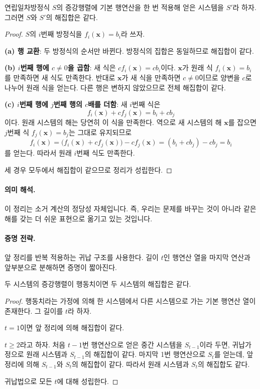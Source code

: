 \begin{theorem}
연립일차방정식 $S$의 증강행렬에 기본 행연산을 한 번 적용해 얻은 시스템을 $S'$라 하자. 그러면 $S$와 $S'$의 해집합은 같다.
\end{theorem}

\begin{proof}
$S$의 $i$번째 방정식을 $f_i(\mathbf{x})=b_i$라 쓰자.

\textbf{(a) 행 교환}:
두 방정식의 순서만 바뀐다. 방정식의 집합은 동일하므로 해집합이 같다.

\textbf{(b) $i$번째 행에 $c\neq 0$을 곱함}:
새 식은 $c f_i(\mathbf{x})=c b_i$이다.  
$\mathbf{x}$가 원래 식 $f_i(\mathbf{x})=b_i$를 만족하면 새 식도 만족한다.  
반대로 $\mathbf{x}$가 새 식을 만족하면 $c\neq 0$이므로 양변을 $c$로 나누어 원래 식을 얻는다. 다른 행은 변하지 않았으므로 전체 해집합이 같다.

\textbf{(c) $i$번째 행에 $j$번째 행의 $c$배를 더함}:
새 $i$번째 식은
\[
f_i(\mathbf{x})+c f_j(\mathbf{x})=b_i+c b_j
\]
이다. 원래 시스템의 해는 당연히 이 식을 만족한다.  
역으로 새 시스템의 해 $\mathbf{x}$를 잡으면 $j$번째 식 $f_j(\mathbf{x})=b_j$는 그대로 유지되므로
\[
f_i(\mathbf{x})=\bigl(f_i(\mathbf{x})+c f_j(\mathbf{x})\bigr)-c f_j(\mathbf{x})
=(b_i+c b_j)-c b_j=b_i
\]
를 얻는다. 따라서 원래 $i$번째 식도 만족한다.

세 경우 모두에서 해집합이 같으므로 정리가 성립한다.
\end{proof}

\paragraph{의미 해석.}
이 정리는 소거 계산의 정당성 자체입니다. 즉, 우리는 문제를 바꾸는 것이 아니라 같은 해를 갖는 더 쉬운 표현으로 옮기고 있는 것입니다.

\paragraph{증명 전략.}
앞 정리를 반복 적용하는 귀납 구조를 사용한다. 길이 $t$인 행연산 열을 마지막 연산과 앞부분으로 분해하면 증명이 짧아진다.

\begin{theorem}
두 시스템의 증강행렬이 행동치이면 두 시스템의 해집합은 같다.
\end{theorem}

\begin{proof}
행동치라는 가정에 의해 한 시스템에서 다른 시스템으로 가는 기본 행연산 열이 존재한다. 그 길이를 $t$라 하자.

$t=1$이면 앞 정리에 의해 해집합이 같다.

$t\ge 2$라고 하자. 처음 $t-1$번 행연산으로 얻은 중간 시스템을 $S_{t-1}$이라 두면, 귀납가정으로 원래 시스템과 $S_{t-1}$의 해집합이 같다. 마지막 1번 행연산으로 $S_t$를 얻는데, 앞 정리에 의해 $S_{t-1}$와 $S_t$의 해집합이 같다. 따라서 원래 시스템과 $S_t$의 해집합도 같다.

귀납법으로 모든 $t$에 대해 성립한다.
\end{proof}

